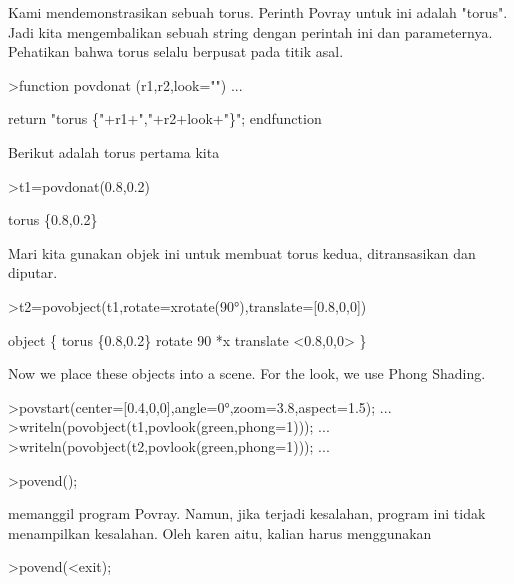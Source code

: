 \documentclass{article}
\begin{document}
\begin{eulernotebook}
\begin{eulercomment}
Kami mendemonstrasikan sebuah torus. Perinth Povray untuk ini adalah
"torus". Jadi kita mengembalikan sebuah string dengan perintah ini dan
parameternya. Pehatikan bahwa torus selalu berpusat pada titik asal.
\end{eulercomment}
\begin{eulerprompt}
>function povdonat (r1,r2,look="") ...
\end{eulerprompt}
\begin{eulerudf}
    return "torus \{"+r1+","+r2+look+"\}";
  endfunction
\end{eulerudf}
\begin{eulercomment}
Berikut adalah torus pertama kita
\end{eulercomment}
\begin{eulerprompt}
>t1=povdonat(0.8,0.2)
\end{eulerprompt}
\begin{euleroutput}
  torus \{0.8,0.2\}
\end{euleroutput}
\begin{eulercomment}
Mari kita gunakan objek ini untuk membuat torus kedua, ditransasikan
dan diputar.
\end{eulercomment}
\begin{eulerprompt}
>t2=povobject(t1,rotate=xrotate(90°),translate=[0.8,0,0])
\end{eulerprompt}
\begin{euleroutput}
  object \{ torus \{0.8,0.2\}
   rotate 90 *x 
   translate <0.8,0,0>
   \}
\end{euleroutput}
\begin{eulercomment}
Now we place these objects into a scene. For the look, we use Phong
Shading.
\end{eulercomment}
\begin{eulerprompt}
>povstart(center=[0.4,0,0],angle=0°,zoom=3.8,aspect=1.5); ...
>writeln(povobject(t1,povlook(green,phong=1))); ...
>writeln(povobject(t2,povlook(green,phong=1))); ...
\end{eulerprompt}
\begin{eulerttcomment}
 >povend();
\end{eulerttcomment}
\begin{eulercomment}
memanggil program Povray. Namun, jika terjadi kesalahan, program ini
tidak menampilkan kesalahan. Oleh karen aitu, kalian harus menggunakan

\end{eulercomment}
\begin{eulerttcomment}
 >povend(<exit);
\end{eulerttcomment}
\begin{eulercomment}


\end{eulercomment}
\end{eulernotebook}
\end{document}
